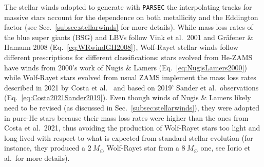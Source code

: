 \documentclass[a4paper,titlepage]{book}     	%
\newcommand{\sun}{\ensuremath{_\odot}}
\newcommand{\msun}{\ensuremath{M\sun}}
\newcommand{\micmap}[1]{\textcolor{red}{MM:\bf#1}}
\newcommand{\erika}[1]{\textcolor{green}{\bf#1}}
\begin{document}
The stellar winds adopted to generate with \texttt{PARSEC} the interpolating tracks for massive stars account for the dependence on  both metallicity and the Eddington factor (see Sec.\ \ref{subsec:stellarwinds} for more details). While mass loss rates of the blue super giants (BSG) and LBVs follow Vink et al.\ 2001 and Gr{\"a}fener \& Hamann 2008 (Eq.\ \ref{eq:WRwindGH2008}), Wolf-Rayet stellar winds follow different prescriptions for different classifications: stars evolved from He-ZAMS have winds from 2000's work of Nugis \& Lamers (Eq.\ \ref{eq:NugisLamers2000}) while Wolf-Rayet stars evolved from usual ZAMS implement the mass loss rates described in 2021 by Costa et al.\ \cite{MassGapStellarEvo_Costa2021} and based on 2019' Sander et al.\ observations \cite{Sander2019_WRwinds} (Eq.\ \ref{eq:Costa2021Sander2019}). Even though winds of Nugis \& Lamers likely need to be revised (as discussed in Sec.\ \ref{subsec:stellarwinds}), they were adopted in pure-He stars because their mass loss rates were higher than the ones from Costa et al.\ 2021, thus avoiding the production of Wolf-Rayet stars too light and long lived with respect to what is expected from standard stellar evolution (for instance, they produced a $2~\msun$ Wolf-Rayet star from a $8~\msun$ one, see Iorio et al.\ for more details). \\
\end{document}
